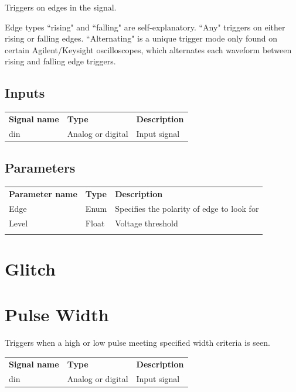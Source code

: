 Triggers on edges in the signal.

Edge types ``rising" and ``falling" are self-explanatory. ``Any" triggers on either rising or falling edges.
``Alternating" is a unique trigger mode only found on certain Agilent/Keysight oscilloscopes, which alternates each
waveform between rising and falling edge triggers.

\subsection{Inputs}

\begin{tabularx}{16cm}{llX}
\thickhline
\textbf{Signal name} & \textbf{Type} & \textbf{Description} \\
\thickhline
din & Analog or digital & Input signal \\
\end{tabularx}

\subsection{Parameters}

\begin{tabularx}{16cm}{llX}
\thickhline
\textbf{Parameter name} & \textbf{Type} & \textbf{Description} \\
\thickhline
Edge & Enum & Specifies the polarity of edge to look for\\
\thickhline
Level & Float & Voltage threshold\\
\thickhline
\end{tabularx}

\section{Glitch}


\section{Pulse Width}

Triggers when a high or low pulse meeting specified width criteria is seen.

\begin{tabularx}{16cm}{llX}
\thickhline
\textbf{Signal name} & \textbf{Type} & \textbf{Description} \\
\thickhline
din & Analog or digital & Input signal \\
\end{tabularx}

